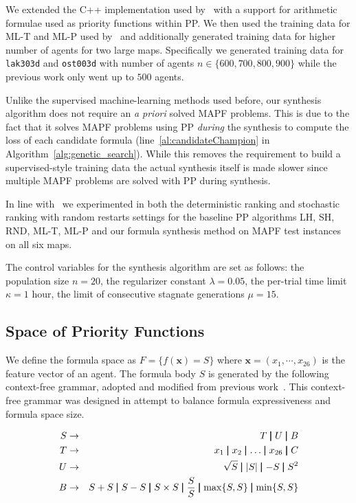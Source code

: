\documentclass[letterpaper]{article}
\newcommand{\midb}{\pmb{\mid}}
\newcommand{\bea}{\begin{eqnarray}}
\newcommand{\eea}{\end{eqnarray}}
\renewcommand{\max}{\operatornamewithlimits{max}\limits}
\begin{document}
We extended the C++ implementation used by~\citet{zhang2022learning} with a support for arithmetic formulae used as priority functions within PP. We then used the training data for ML-T and ML-P used by~\citet{zhang2022learning} and additionally generated training data for higher number of agents for two large maps. Specifically we generated training data for {\tt lak303d} and {\tt ost003d} with number of agents $ n \in \{600, 700, 800, 900\} $ while the previous work only went up to $ 500 $ agents.

Unlike the supervised machine-learning methods used before, our synthesis algorithm does not require an \textit{a priori} solved MAPF problems. This is due to the fact that it solves MAPF problems using PP {\em during} the synthesis to compute the loss of each candidate formula (line~\ref{al:candidateChampion} in Algorithm~\ref{alg:genetic_search}). While this removes the requirement to build a supervised-style training data the actual synthesis itself is made slower since multiple MAPF problems are solved with PP during synthesis.

In line with~\citet{zhang2022learning} we experimented in both the deterministic ranking and stochastic ranking with random restarts settings for the baseline PP algorithms LH, SH, RND, ML-T, ML-P and our formula synthesis method on MAPF test instances on all six maps.

The control variables for the synthesis algorithm are set as follows: the population size $ n = 20 $, the regularizer constant $ \lambda = 0.05 $, the per-trial time limit $ \kappa = 1 $ hour, the limit of consecutive stagnate generations $ \mu = 15 $.



\subsection{Space of Priority Functions}
\label{sec:synthesisSpaceP}

We define the formula space as $ F = \{f(\mathbf{x}) = S\} $ where $ \mathbf{x} = (x_1, \cdots, x_{26}) $ is the feature vector of an agent. The formula body $ S $ is generated by the following context-free grammar, adopted and modified from previous work~\citet{bulitko2022portability}. This context-free grammar was designed in attempt to balance formula expressiveness and formula space size.

{\small\bea
S &\to& T \midb U \midb B \nonumber \\
T &\to& x_1 \midb x_2 \midb \dots \midb x_{26} \midb C \nonumber  \\
U &\to& \sqrt{S} \midb |S| \midb -S \midb S^2 \nonumber \\
B &\to& S+S \midb S-S \midb S \times S \midb \frac{S}{S} \midb \max\{S,S\} \midb \min\{S,S\} \nonumber
\eea}
\end{document}
